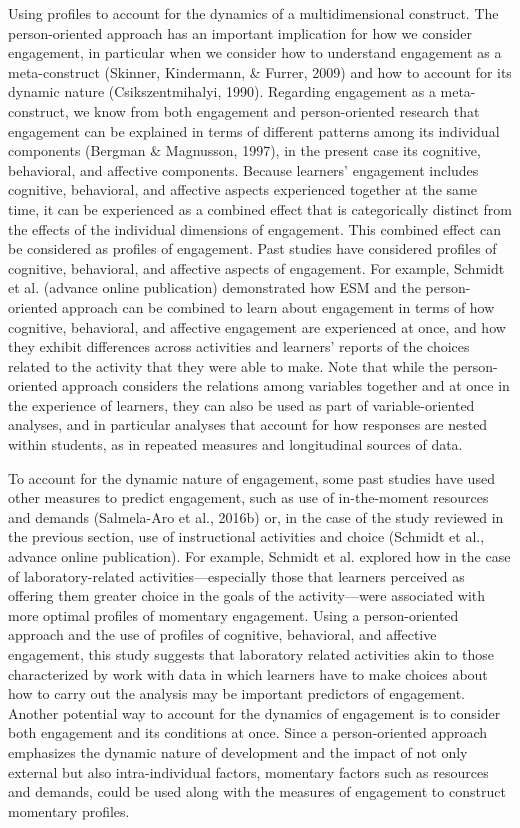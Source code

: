 \documentclass[]{msu-thesis}
\theoremstyle{definition}
\theoremstyle{definition}
\theoremstyle{definition}
\theoremstyle{remark}
\begin{document}
Using profiles to account for the dynamics of a multidimensional
construct. The person-oriented approach has an important implication for
how we consider engagement, in particular when we consider how to
understand engagement as a meta-construct (Skinner, Kindermann, \&
Furrer, 2009) and how to account for its dynamic nature
(Csikszentmihalyi, 1990). Regarding engagement as a meta-construct, we
know from both engagement and person-oriented research that engagement
can be explained in terms of different patterns among its individual
components (Bergman \& Magnusson, 1997), in the present case its
cognitive, behavioral, and affective components. Because learners'
engagement includes cognitive, behavioral, and affective aspects
experienced together at the same time, it can be experienced as a
combined effect that is categorically distinct from the effects of the
individual dimensions of engagement. This combined effect can be
considered as profiles of engagement. Past studies have considered
profiles of cognitive, behavioral, and affective aspects of engagement.
For example, Schmidt et al. (advance online publication) demonstrated
how ESM and the person-oriented approach can be combined to learn about
engagement in terms of how cognitive, behavioral, and affective
engagement are experienced at once, and how they exhibit differences
across activities and learners' reports of the choices related to the
activity that they were able to make. Note that while the
person-oriented approach considers the relations among variables
together and at once in the experience of learners, they can also be
used as part of variable-oriented analyses, and in particular analyses
that account for how responses are nested within students, as in
repeated measures and longitudinal sources of data.

To account for the dynamic nature of engagement, some past studies have
used other measures to predict engagement, such as use of in-the-moment
resources and demands (Salmela-Aro et al., 2016b) or, in the case of the
study reviewed in the previous section, use of instructional activities
and choice (Schmidt et al., advance online publication). For example,
Schmidt et al. explored how in the case of laboratory-related
activities---especially those that learners perceived as offering them
greater choice in the goals of the activity---were associated with more
optimal profiles of momentary engagement. Using a person-oriented
approach and the use of profiles of cognitive, behavioral, and affective
engagement, this study suggests that laboratory related activities akin
to those characterized by work with data in which learners have to make
choices about how to carry out the analysis may be important predictors
of engagement. Another potential way to account for the dynamics of
engagement is to consider both engagement and its conditions at once.
Since a person-oriented approach emphasizes the dynamic nature of
development and the impact of not only external but also
intra-individual factors, momentary factors such as resources and
demands, could be used along with the measures of engagement to
construct momentary profiles.
\end{document}
